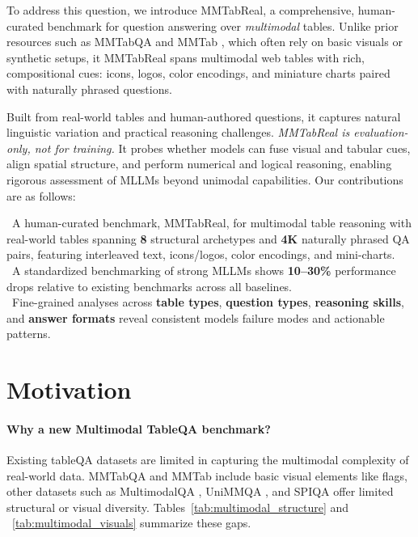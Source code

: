 \documentclass[11pt]{article}
\newcommand{\datasetName}{{\sc MMTabReal}\xspace}
\begin{document}
To address this question, we introduce \datasetName{}, a comprehensive, human-curated benchmark for question answering over \emph{multimodal} tables. Unlike prior resources such as MMTabQA \cite{mathur-etal-2024-knowledge} and MMTab \cite{zheng2024multimodal}, which often rely on basic visuals or synthetic setups, it \datasetName{} spans multimodal web tables with rich, compositional cues: icons, logos, color encodings, and miniature charts paired with naturally phrased questions. 



Built from real-world tables and human-authored questions, it captures natural linguistic variation and practical reasoning challenges. \emph{\datasetName{} is evaluation-only, not for training.} It probes whether models can fuse visual and tabular cues, align spatial structure, and perform numerical and logical reasoning, enabling rigorous assessment of MLLMs beyond unimodal capabilities. Our contributions are as follows:
\vspace{0.3em}


\noindent\textbullet\ A human-curated benchmark, \datasetName, for multimodal table reasoning with real-world tables spanning \textbf{8} structural archetypes and \textbf{4K} naturally phrased QA pairs, featuring interleaved text, icons/logos, color encodings, and mini-charts.\\
\noindent\textbullet\  A standardized benchmarking of strong MLLMs shows \textbf{10--30\%} performance drops relative to existing benchmarks across all baselines.\\
\noindent\textbullet\ Fine-grained analyses across \textbf{table types}, \textbf{question types}, \textbf{reasoning skills}, and \textbf{answer formats} reveal consistent models failure modes and actionable patterns.




\section{Motivation} \label{sec:motivation}


\paragraph{Why a new Multimodal TableQA benchmark?}  Existing tableQA datasets are limited in capturing the multimodal complexity of real-world data. MMTabQA \cite{mathur-etal-2024-knowledge} and MMTab \cite{zheng2024multimodal} include basic visual elements like flags, other datasets such as MultimodalQA \cite{talmor2021multimodalqa}, UniMMQA \cite{luo-etal-2023-unifying}, and SPIQA \cite{yvinec2023spiq} offer limited structural or visual diversity. Tables~\ref{tab:multimodal_structure} and ~\ref{tab:multimodal_visuals} summarize these gaps.
\end{document}
